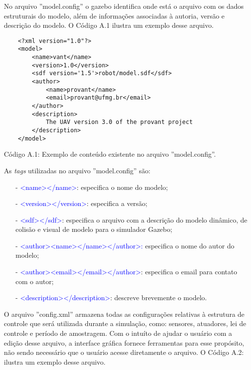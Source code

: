 No arquivo ''model.config'' o gazebo identifica onde está o arquivo com os dados estruturais do modelo, além de informações associadas à autoria, versão e descrição do modelo. O Código A.1 ilustra um exemplo desse arquivo. 


	\begin{verbatim}
	<?xml version="1.0"?>
	<model>
		<name>vant</name>
		<version>1.0</version>
		<sdf version='1.5'>robot/model.sdf</sdf>
		<author>
			<name>provant</name>
			<email>provant@ufmg.br</email>
		</author>
		<description>
			The UAV version 3.0 of the provant project 
		</description>
	</model>
	\end{verbatim}
	
	\centerline{Código A.1: Exemplo de conteúdo existente no arquivo ''model.config''.}
	
	\vspace{1cm}


As \textit{tags} utilizadas no arquivo ''model.config'' são:

\small
\begin{itemize}
\setlength{\itemsep}{1pt}
\setlength{\parskip}{0pt}
\setlength{\parsep}{0pt}
\item[-] \textcolor{blue}{<name></name>}: especifica o nome do modelo;
\item[-] \textcolor{blue}{<version></version>}: especifica a versão;
\item[-] \textcolor{blue}{<sdf></sdf>}: especifica o arquivo com a descrição do modelo dinâmico, de colisão e visual de modelo para o simulador Gazebo;
\item[-] \textcolor{blue}{<author><name></name></author>}\textcolor{blue}: especifica o nome do autor do modelo;
\item[-] \textcolor{blue}{<author><email></email></author>}: especifica o email para contato com o autor;
\item[-] \textcolor{blue}{<description></description>}: descreve brevemente o modelo.
\end{itemize}\normalsize


O arquivo ''config.xml'' armazena todas as configurações relativas à estrutura de controle que será utilizada durante a simulação, como: sensores, atuadores, lei de controle e período de amostragem. Com o intuíto de ajudar o usuário com a edição desse arquivo, a interface gráfica fornece ferramentas para esse propósito, não sendo necessário que o usuário acesse diretamente o arquivo. O Código A.2: ilustra um exemplo desse arquivo. 


